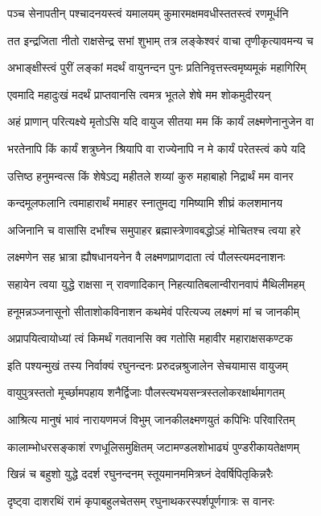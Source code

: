 \twolineshloka
{पञ्च सेनापतीन् पश्चादनयस्त्वं यमालयम्}
{कुमारमक्षमवधीस्ततस्त्वं रणमूर्धनि}%

\twolineshloka
{तत इन्द्रजिता नीतो राक्षसेन्द्र सभां शुभाम्}
{तत्र लङ्केश्वरं वाचा तृणीकृत्यावमन्य च}%

\twolineshloka
{अभाङ्क्षीस्त्वं पुरीं लङ्कां मदर्थं वायुनन्दन}
{पुनः प्रतिनिवृत्तस्त्वमृष्यमूकं महागिरिम्}%

\twolineshloka
{एवमादि महादुःखं मदर्थं प्राप्तवानसि}
{त्वमत्र भूतले शेषे मम शोकमुदीरयन्}%

\twolineshloka
{अहं प्राणान् परित्यक्ष्ये मृतोऽसि यदि वायुज}
{सीतया मम किं कार्यं लक्ष्मणेनानुजेन वा}%

\twolineshloka
{भरतेनापि किं कार्यं शत्रुघ्नेन श्रियापि वा}
{राज्येनापि न मे कार्यं परेतस्त्वं कपे यदि}%

\twolineshloka
{उत्तिष्ठ हनुमन्वत्स किं शेषेऽद्य महीतले}
{शय्यां कुरु महाबाहो निद्रार्थं मम वानर}%

\twolineshloka
{कन्दमूलफलानि त्वमाहारार्थं ममाहर}
{स्नातुमद्य गमिष्यामि शीघ्रं कलशमानय}%

\twolineshloka
{अजिनानि च वासांसि दर्भांश्च समुपाहर}
{ब्रह्मास्त्रेणावबद्धोऽहं मोचितश्च त्वया हरे}%

\twolineshloka
{लक्ष्मणेन सह भ्रात्रा ह्यौषधानयनेन वै}
{लक्ष्मणप्राणदाता त्वं पौलस्त्यमदनाशनः}%

\twolineshloka
{सहायेन त्वया युद्धे राक्षसा न् रावणादिकान्}
{निहत्यातिबलान्वीरानवापं मैथिलीमहम्}%

\twolineshloka
{हनूमन्नञ्जनासूनो सीताशोकविनाशन}
{कथमेवं परित्यज्य लक्ष्मणं मां च जानकीम्}%

\twolineshloka
{अप्रापयित्वायोध्यां त्वं किमर्थं गतवानसि}
{क्व गतोसि महावीर महाराक्षसकण्टक}%

\twolineshloka
{इति पश्यन्मुखं तस्य निर्वाक्यं रघुनन्दनः}
{प्ररुदन्नश्रुजालेन सेचयामास वायुजम्}%

\twolineshloka
{वायुपुत्रस्ततो मूर्च्छामपहाय शनैर्द्विजाः}
{पौलस्त्यभयसन्त्रस्तलोकरक्षार्थमागतम्}%

\twolineshloka
{आश्रित्य मानुषं भावं नारायणमजं विभुम्}
{जानकीलक्ष्मणयुतं कपिभिः परिवारितम्}%

\twolineshloka
{कालाम्भोधरसङ्काशं रणधूलिसमुक्षितम्}
{जटामण्डलशोभाढ्यं पुण्डरीकायतेक्षणम्}%

\twolineshloka
{खिन्नं च बहुशो युद्धे ददर्श रघुनन्दनम्}
{स्तूयमानममित्रघ्नं देवर्षिपितृकिन्नरैः}%

\twolineshloka
{दृष्ट्वा दाशरथिं रामं कृपाबहुलचेतसम्}
{रघुनाथकरस्पर्शपूर्णगात्रः स वानरः}%

